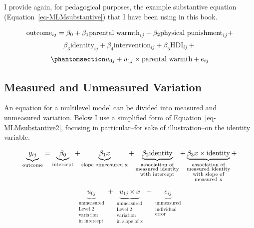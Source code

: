 \documentclass[
  letterpaper,
  DIV=11,
  numbers=noendperiod]{scrreprt}
\begin{document}
I provide again, for pedagogical purposes, the example substantive
equation (Equation~\ref{eq-MLMsubstantive}) that I have been using in
this book.

\[\text{outcome}_{ij} = \beta_0 + \beta_1 \text{parental warmth}_{ij} + \\ \beta_2 \text{physical punishment}_{ij} +\]
\[\beta_3 \text{identity}_{ij} + \beta_4 \text{intervention}_{ij} + \beta_5 \text{HDI}_{ij} + \]
\begin{equation}\phantomsection\label{eq-MLMsubstantive2}{u_{0j} + u_{1j} \times \text{parental warmth} + e_{ij}}\end{equation}

\subsection{Measured and Unmeasured
Variation}\label{sec-measured-unmeasured-variation}

An equation for a multilevel model can be divided into measured and
unmeasured variation. Below I use a simplified form of
Equation~\ref{eq-MLMsubstantive2}, focusing in particular--for sake of
illustration--on the identity variable.

\[\underbrace{y_{ij}}_\text{outcome} = \underbrace{\beta_0}_\text{intercept} + \underbrace{\beta_1 x}_{\text{slope of} \\ \text{measured x}} + \underbrace{\beta_2 \text{identity}}_{\substack{\text{association of} \\ \text{measured identity} \\ \text{with intercept}}} + \underbrace{\beta_3 x \times \text{identity}}_{\substack{\text{association of} \\ \text{measured identity} \\ \text{with slope of} \\  \text{measured x}}} + \]

\[\underbrace{u_{0j}}_{\substack{\text{unmeasured} \\ \text{Level 2} \\ \text{variation} \\ \text{in intercept}}} + \underbrace{u_{1j} \times x}_{\substack{\text{unmeasured} \\ \text{Level 2} \\ \text{variation} \\ \text{in slope of x}}} + \underbrace{e_{ij}}_{\substack{\text{unmeasured} \\ \text{individual} \\ \text{error}}}\]
\end{document}
